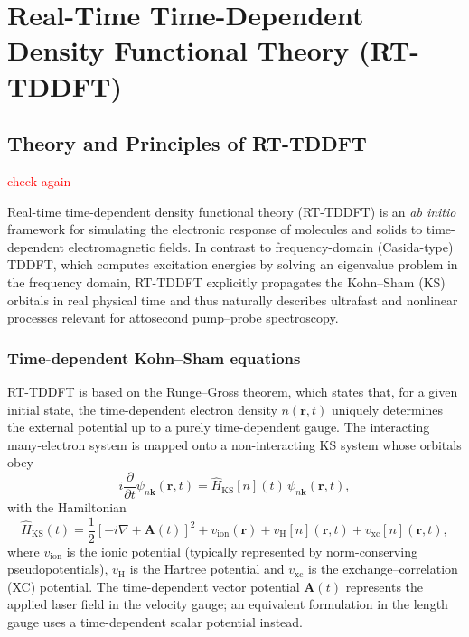 \chapter{Real-Time Time-Dependent Density Functional Theory (RT-TDDFT)}
\label{chap:tddft}



\section{Theory and Principles of RT-TDDFT}

\textcolor{red}{check again}

Real-time time-dependent density functional theory (RT-TDDFT) is an \textit{ab initio} framework for simulating the electronic response of molecules and solids to time-dependent electromagnetic fields. 
In contrast to frequency-domain (Casida-type) TDDFT, which computes excitation energies by solving an eigenvalue problem in the frequency domain, RT-TDDFT explicitly propagates the Kohn--Sham (KS) orbitals in real physical time and thus naturally describes ultrafast and nonlinear processes relevant for attosecond pump--probe spectroscopy.\cite{RungeGross1984,Yabana2012,Sato2025review}

\subsection{Time-dependent Kohn--Sham equations}

RT-TDDFT is based on the Runge--Gross theorem,\cite{RungeGross1984} which states that, for a given initial state, the time-dependent electron density $n(\mathbf r,t)$ uniquely determines the external potential up to a purely time-dependent gauge. 
The interacting many-electron system is mapped onto a non-interacting KS system whose orbitals obey
\begin{equation}
  i\frac{\partial}{\partial t}\psi_{n\mathbf{k}}(\mathbf r,t)
  = \hat{H}_{\mathrm{KS}}[n](t)\,\psi_{n\mathbf{k}}(\mathbf r,t),
  \label{eq:TDKS}
\end{equation}
with the Hamiltonian
\begin{equation}
  \hat{H}_{\mathrm{KS}}(t)
  = \frac{1}{2}\left[-i\nabla + \mathbf A(t)\right]^2
    + v_{\mathrm{ion}}(\mathbf r)
    + v_{\mathrm{H}}[n](\mathbf r,t)
    + v_{\mathrm{xc}}[n](\mathbf r,t),
\end{equation}
where $v_{\mathrm{ion}}$ is the ionic potential (typically represented by norm-conserving pseudopotentials), $v_{\mathrm{H}}$ is the Hartree potential and $v_{\mathrm{xc}}$ is the exchange--correlation (XC) potential. 
The time-dependent vector potential $\mathbf A(t)$ represents the applied laser field in the velocity gauge; an equivalent formulation in the length gauge uses a time-dependent scalar potential instead.\cite{Yabana2012,Sato2014}

